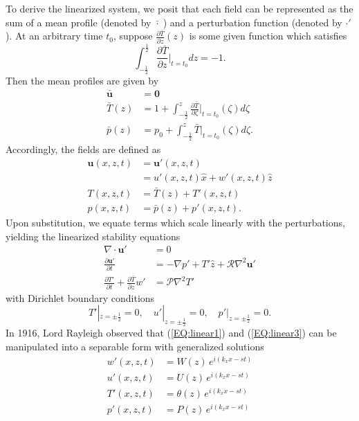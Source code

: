 \documentclass[reprint,amsmath,amssymb,aps]{revtex4-1}
\begin{document}
To derive the linearized system, we posit that each field can be represented as the sum of a mean profile (denoted by $\bar{\cdot } \;$) and a perturbation function (denoted by $\cdot'$). 
At an arbitrary time $t_0$, suppose $\frac{\partial \bar{T}}{\partial z} (z)$ is some given function which satisfies
\begin{equation}
    \int_{-\frac{1}{2}}^{\frac{1}{2}} \frac{\partial \bar{T}}{\partial z}\Big|_{t=t_0} dz = -1.
\end{equation}
Then the mean profiles are given by
\begin{align}
    \mathbf{\bar{u}} &= \mathbf{0} \\
    \bar{T}(z) &= 1 + \int_{-\frac{1}{2}}^{z} \frac{\partial \bar{T}}{\partial \zeta}\Big|_{t=t_0}(\zeta) d\zeta \\
    \bar{p}(z) &= p_0 + \int_{-\frac{1}{2}}^z \bar{T}\Big|_{t=t_0}(\zeta) d\zeta.
\end{align}
Accordingly, the fields are defined as
\begin{align}
    \mathbf{u}(x, z, t) &= \mathbf{u'}(x, z, t) \label{EQ:reynolds_dc_u}\\
    &= u'(x, z, t)\hat{x} + w'(x, z, t)\hat{z} \\
    T(x, z, t) &= \bar{T}(z) + T'(x, z, t) \label{EQ:reynolds_dc_T}\\
    p(x, z, t) &= \bar{p}(z) + p'(x, z, t).
\end{align}
Upon substitution, we equate terms which scale linearly with the perturbations, yielding the linearized stability equations
\begin{align}
    \nabla \cdot \mathbf{u'} &= 0 \label{EQ:linear1}\\
    \frac{\partial\mathbf{u'}}{\partial t} &= - \nabla p' + T'\hat{z} + \mathcal{R} \nabla^2 \mathbf{u'} \label{EQ:linear2}\\
    \frac{\partial T'}{\partial t} + \frac{\partial \bar{T}}{\partial z} w' &= \mathcal{P} \nabla^2 T' \label{EQ:linear3}
\end{align}
with Dirichlet boundary conditions 
\begin{equation}
    T'|_{z = \pm \frac{1}{2}} = 0, \quad u'|_{z = \pm \frac{1}{2}} = 0, \quad p'|_{z = \pm \frac{1}{2}} = 0.
\end{equation}
In 1916, Lord Rayleigh observed that (\ref{EQ:linear1}) and (\ref{EQ:linear3}) can be manipulated into a separable form with generalized solutions
\begin{align}
    w'(x, z, t) &= W(z) \, e^{i(k_xx-st)} \label{EQ:normal_modes1}\\ 
    u'(x, z, t) &= U(z) \, e^{i(k_xx-st)} \label{EQ:normal_modes2}\\ 
    T'(x, z, t) &= \theta(z) \, e^{i(k_xx-st)} \label{EQ:normal_modes3}\\ 
    p'(x, z, t) &= P(z) \, e^{i(k_xx-st)}\label{EQ:normal_modes4}
\end{align}
\end{document}

